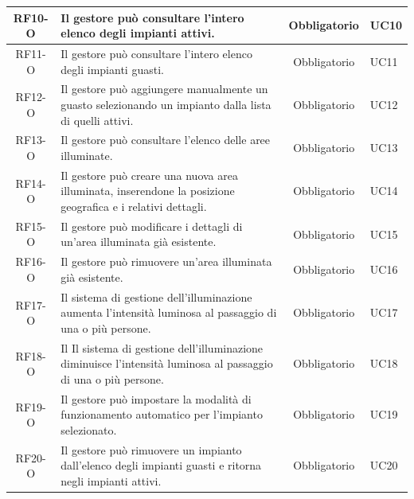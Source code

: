 \documentclass[a4paper, 12pt]{article}
\begin{document}
\begin{longtable}{|c|p{7cm}|c|p{4cm}|}
    RF10-O & Il gestore può consultare l'intero elenco degli impianti attivi. & Obbligatorio & UC10 \\
    \hline
    RF11-O & Il gestore può consultare l'intero elenco degli impianti guasti. & Obbligatorio & UC11 \\
    \hline
    RF12-O & Il gestore può aggiungere manualmente un guasto selezionando un
    impianto dalla lista di quelli attivi. & Obbligatorio & UC12 \\
    \hline
    RF13-O & Il gestore può consultare l'elenco delle aree illuminate. & Obbligatorio & UC13 \\
    \hline
    RF14-O & Il gestore può creare una nuova area illuminata, inserendone la
    posizione geografica e i relativi dettagli. & Obbligatorio & UC14 \\
    \hline
    RF15-O & Il gestore può modificare i dettagli di un'area illuminata già esistente. & Obbligatorio & UC15 \\
    \hline
    RF16-O & Il gestore può rimuovere un'area illuminata già esistente. &
    Obbligatorio & UC16 \\
    \hline
    RF17-O & Il sistema di gestione dell'illuminazione aumenta l'intensità
    luminosa al passaggio di una o più persone. & Obbligatorio & UC17 \\
    \hline
    RF18-O & Il Il sistema di gestione dell'illuminazione diminuisce l'intensità
    luminosa al passaggio di una o più persone. & Obbligatorio & UC18 \\
    \hline
    RF19-O & Il gestore può impostare la modalità di funzionamento automatico
    per l'impianto selezionato. & Obbligatorio & UC19 \\
    \hline
    RF20-O & Il gestore può rimuovere un impianto dall'elenco degli impianti
    guasti e ritorna negli impianti attivi. & Obbligatorio & UC20 \\
    \bottomrule
\end{longtable}
\end{document}
